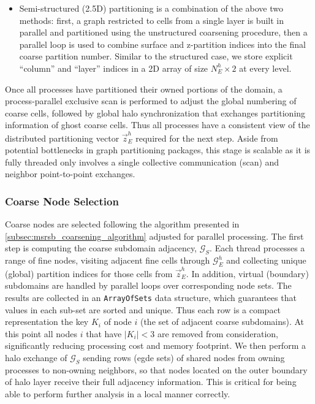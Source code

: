 \begin{itemize}
\item Semi-structured (2.5D) partitioning is a combination of the above two methods: first, a graph restricted to cells from a single layer is built in parallel and partitioned using the unstructured coarsening procedure, then a parallel loop is used to combine surface and z-partition indices into the final coarse partition number.   Similar to the structured case, we store explicit ``column'' and ``layer'' indices in a 2D array of size $N_E^h \times 2$ at every level.
\end{itemize}
Once all processes have partitioned their owned portions of the domain, a process-parallel exclusive scan is performed to adjust the global numbering of coarse cells, followed by global halo synchronization that exchanges partitioning information of ghost coarse cells.   Thus all processes have a consistent view of the distributed partitioning vector $\vec{z}_E^h$ required for the next step.   Aside from potential bottlenecks in graph partitioning packages, this stage is scalable as it is fully threaded only involves a single collective communication (scan) and neighbor point-to-point exchanges.

\subsubsection{Coarse Node Selection}
\label{subsubsec:par_kernels_coarsening_nodes}

Coarse nodes are selected following the algorithm presented in \cref{subsec:msrsb_coarsening_algorithm} adjusted for parallel processing.   The first step is computing the coarse subdomain adjacency, $\mathcal{G}_S$.   Each thread processes a range of fine nodes, visiting adjacent fine cells through $\mathcal{G}_E^h$ and collecting unique (global) partition indices for those cells from $\vec{z}_E^h$.   In addition, virtual (boundary) subdomains are handled by parallel loops over corresponding node sets.   The results are collected in an \texttt{ArrayOfSets} data structure, which guarantees that values in each sub-set are sorted and unique.   Thus each row is a compact representation the key $K_i$ of node $i$ (the set of adjacent coarse subdomains).   At this point all nodes $i$ that have $|K_i| < 3$ are removed from consideration, significantly reducing processing cost and memory footprint.   We then perform a halo exchange of $\mathcal{G}_S$ sending rows (egde sets) of shared nodes from owning processes to non-owning neighbors, so that nodes located on the outer boundary of halo layer receive their full adjacency information.    This is critical for being able to perform further analysis in a local manner correctly.

